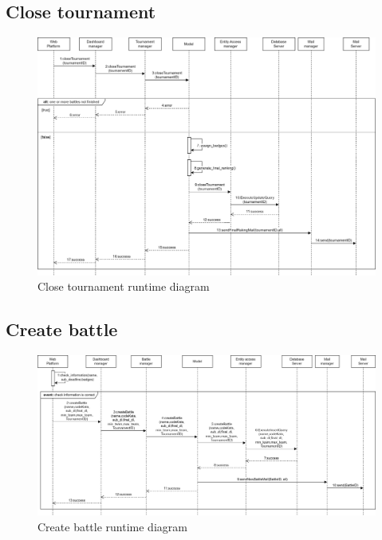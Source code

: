 \subsection*{Close tournament}
\begin{figure}[h]
    \centering
    \includegraphics[width=\textwidth]{images/runtime/closeT.png}
    \caption{Close tournament runtime diagram}
    \label{fig:rt-closeT}
\end{figure}
\clearpage

\subsection*{Create battle}
\begin{figure}[h]
    \centering
    \includegraphics[width=\textwidth]{images/runtime/createB.png}
    \caption{Create battle runtime diagram}
    \label{fig:rt-createB}
\end{figure}

